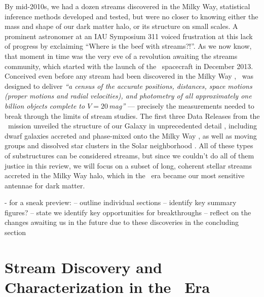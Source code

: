 \documentclass[final,5p,times,twocolumn,authoryear]{elsarticle}
\begin{document}
By mid-2010s, we had a dozen streams discovered in the Milky Way, statistical inference methods developed and tested, but were no closer to knowing either the mass and shape of our dark matter halo, or its structure on small scales.
A prominent astronomer at an IAU Symposium 311 voiced frustration at this lack of progress by exclaiming ``Where is the beef with streams?!''.
As we now know, that moment in time was the very eve of a revolution awaiting the streams community, which started with the launch of the \gaia\ spacecraft in December 2013.
Conceived even before any stream had been discovered in the Milky Way \citep{lindegren:1993, battrick:1994, lindegren:1996}, \gaia\ was designed to deliver \emph{``a census of the accurate positions, distances, space motions (proper motions and radial velocities), and photometry of all approximately one billion objects complete to $V=20$\,mag''} \citep{perryman:2001} --- precisely the measurements needed to break through the limits of stream studies.
The first three Data Releases from the \gaia\ mission unveiled the structure of our Galaxy in unprecedented detail \citep{babusiaux:2018, helmi:2018, katz:2018, antoja:2021, smart:2021, drimmel:2023, schultheis:2023}, including dwarf galaxies accreted and phase-mixed onto the Milky Way \citep{helmi, belokurov, myeong, naidu:2020, kraken}, as well as moving groups and dissolved star clusters in the Solar neighborhood \citep{hyades, pleiades, hercules}.
All of these types of substructures can be considered streams, but since we couldn't do all of them justice in this review, we will focus on a subset of long, coherent stellar streams accreted in the Milky Way halo, which in the \gaia\ era became our most sensitive antennae for dark matter.

- for a sneak preview:
-- outline individual sections
-- identify key summary figures?
-- state we identify key opportunities for breakthroughs
-- reflect on the changes awaiting us in the future due to these discoveries in the concluding section



\section{Stream Discovery and Characterization in the \gaia\ Era}
\label{sec:discovery}
\end{document}
